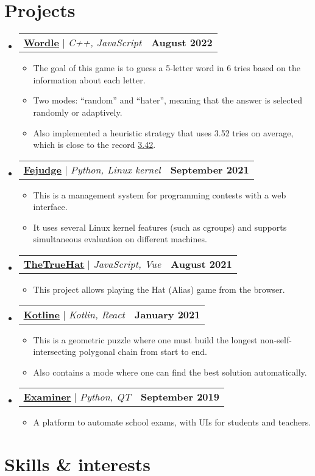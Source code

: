 \documentclass[letterpaper,11pt]{article}
\makeatletter
\newcommand{\resumeProjectHeading}[2]{
	\item
	\begin{tabular*}{1.0\textwidth}{l@{\extracolsep{\fill}}r}
		\small #1 & \textbf{\small #2} \\
	\end{tabular*}\vspace{-7pt}
}
\newcommand{\resumeSubHeadingListStart}{\begin{itemize}[leftmargin=0.0in, label={}]}
\newcommand{\resumeSubHeadingListEnd}{\end{itemize}}
\newcommand{\resumeItemListStart}{\begin{itemize}}
\newcommand{\resumeItemListEnd}{\end{itemize}\vspace{-8pt}}
\newcommand{\resumeItem}[1]{\item\small{{#1 \vspace{-2pt}}}}
\makeatother
\begin{document}
\section{Projects}

\resumeSubHeadingListStart

\resumeProjectHeading
{\textbf{\href{https://github.com/kuyanov/wordle}{\underline{Wordle}}} $|$ \emph{C++, JavaScript}}{August 2022}
\resumeItemListStart
\resumeItem{The goal of this game is to guess a 5-letter word in 6 tries based on the information about each letter.}
\resumeItem{Two modes: ``random'' and ``hater'', meaning that the answer is selected randomly or adaptively.}
\resumeItem{Also implemented a heuristic strategy that uses 3.52 tries on average, which is close to the record \href{https://auction-upload-files.s3.amazonaws.com/Wordle_Paper_Final.pdf}{\underline{3.42}}.}
\resumeItemListEnd

\resumeProjectHeading
{\textbf{\href{https://github.com/m20-sch57/fejudge}{\underline{Fejudge}}} $|$ \emph{Python, Linux kernel}}{September 2021}
\resumeItemListStart
\resumeItem{This is a management system for programming contests with a web interface.}
\resumeItem{It uses several Linux kernel features (such as cgroups) and supports simultaneous evaluation on different machines.}
\resumeItemListEnd

\resumeProjectHeading
{\textbf{\href{https://github.com/m20-sch57/thetruehat}{\underline{TheTrueHat}}} $|$ \emph{JavaScript, Vue}}{August 2021}
\resumeItemListStart
\resumeItem{This project allows playing the Hat (Alias) game from the browser.}
\resumeItemListEnd

\resumeProjectHeading
{\textbf{\href{https://github.com/JaggedLine/kotline}{\underline{Kotline}}} $|$ \emph{Kotlin, React}}{January 2021}
\resumeItemListStart
\resumeItem{This is a geometric puzzle where one must build the longest non-self-intersecting polygonal chain from start to end.}
\resumeItem{Also contains a mode where one can find the best solution automatically.}
\resumeItemListEnd

\resumeProjectHeading
{\textbf{\href{https://github.com/m20-sch57/exam-system}{\underline{Examiner}}} $|$ \emph{Python, QT}}{September 2019}
\resumeItemListStart
\resumeItem{A platform to automate school exams, with UIs for students and teachers.}
\resumeItemListEnd

\resumeSubHeadingListEnd


\section{Skills \& interests}
\end{document}
